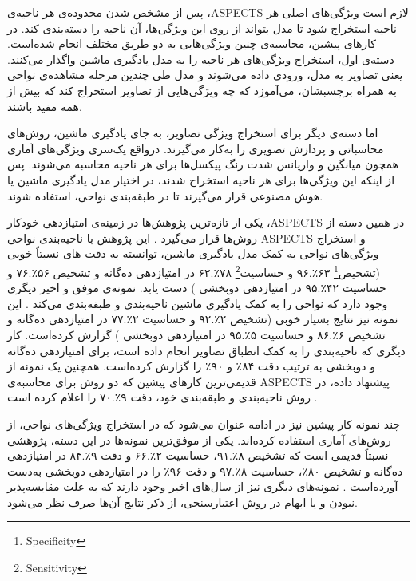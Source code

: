 پس از مشخص شدن محدوده‌ی هر ناحیه‌ی ،ASPECTS لازم است ویژگی‌های اصلی هر ناحیه استخراج شود تا مدل بتواند از روی این ویژگی‌ها، آن ناحیه را دسته‌بندی کند.
در کارهای پیشین، محاسبه‌ی چنین ویژگی‌هایی به دو طریق مختلف انجام شده‌است.
دسته‌ی اول، استخراج ویژگی‌های هر ناحیه را به مدل یادگیری ماشین واگذار می‌کنند.
یعنی تصاویر به مدل، ورودی داده می‌شوند و مدل طی چندین مرحله مشاهده‌ی نواحی به همراه برچسبشان، می‌آموزد که چه ویژگی‌هایی از تصاویر استخراج کند که بیش از همه مفید باشند.

اما دسته‌ی دیگر برای استخراج ویژگی تصاویر، به جای یادگیری ماشین، روش‌های محاسباتی و پردازش تصویری را به‌کار می‌گیرند.
درواقع یک‌سری ویژگی‌های آماری همچون میانگین و واریانس شدت رنگ پیکسل‌ها برای هر ناحیه محاسبه می‌شوند.
پس از اینکه این ویژگی‌ها برای هر ناحیه استخراج شدند، 
در اختیار مدل یادگیری ماشین یا هوش مصنوعی قرار می‌گیرند
تا 
در طبقه‌بندی نواحی، استفاده شوند.

یکی از تازه‌ترین پژوهش‌ها در زمینه‌ی امتیاز‌دهی خودکار ،ASPECTS در همین دسته‌ از روش‌ها قرار می‌گیرد \cite{lee2023clinical}.
این پژوهش با ناحیه‌بندی نواحی ASPECTS و استخراج ویژگی‌های نواحی به کمک مدل یادگیری ماشین، توانسته به دقت های نسبتاً خوبی 
(تشخیص\footnote{Specificity}
۶۳٪.۹۶
و
حساسیت\footnote{Sensitivity}
۷۸٪.۶۲
در امتیازدهی ده‌گانه و 
تشخیص
۵۶٪.۷۶
و
حساسیت
۴۲٪.۹۵
در امتیازدهی دوبخشی 
)
دست یابد.
نمونه‌ی موفق و اخیر دیگری وجود دارد که نواحی را به کمک یادگیری ماشین ناحیه‌بندی و طبقه‌بندی می‌کند \cite{cao2022deep}.
این نمونه نیز نتایج بسیار خوبی 
(تشخیص
۲٪.۹۲
و
حساسیت
۲٪.۷۷
در امتیازدهی ده‌گانه و 
تشخیص
۶٪.۸۶
و
حساسیت
۵٪.۹۵
در امتیازدهی دوبخشی 
)
گزارش کرده‌است.
کار دیگری
\cite{kuang2021eis}
که ناحیه‌بندی را به کمک انطباق تصاویر انجام داده است،
برای امتیازدهی ده‌گانه و دو‌بخشی به ترتیب دقت
۸۴٪ 
و 
۹۰٪ 
را گزارش کرده‌است.
همچنین یک نمونه از قدیمی‌ترین کار‌های پیشین که دو روش برای محاسبه‌ی ASPECTS پیشنهاد داده، در روش ناحیه‌بندی و طبقه‌بندی خود،  
دقت
۹٪.۷۰
را اعلام کرده است \cite{jung2018evaluating}.

چند نمونه کار پیشین نیز در ادامه عنوان می‌شود که در استخراج ویژگی‌های نواحی، از روش‌های آماری استفاده کرده‌اند.
یکی از موفق‌ترین نمونه‌ها در این دسته، پژوهشی نسبتاً قدیمی است که
تشخیص
۸٪.۹۱،
حساسیت
۲٪.۶۶
و دقت 
۹٪.۸۴
در امتیازدهی ده‌گانه و 
تشخیص
۸۰٪،
حساسیت
۸٪.۹۷
و دقت 
۹۶٪
را
در امتیازدهی دوبخشی 
به‌دست آورده‌است \cite{kuang2019automated}.
نمونه‌های دیگری نیز از سال‌های اخیر وجود دارند
\cite{liu2021deep,yu2021automated}
که به علت مقایسه‌پذیر نبودن و یا ابهام در روش اعتبارسنجی، از ذکر نتایج آن‌ها صرف نظر می‌شود.

